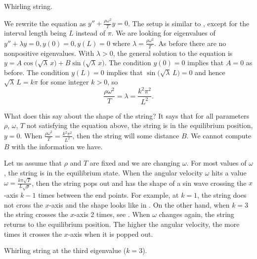 \begin{myfig}
\capstart
{}
\caption{Whirling string.\label{bvp:whirstringfig}}
\end{myfig}

We rewrite the equation as
$y'' + \frac{\rho \omega^2}{T} y = 0$.
The setup is similar to , except for the
interval length being $L$ instead of $\pi$.  We are looking for eigenvalues
of $y'' + \lambda y = 0, y(0) = 0, y(L) = 0$ where
$\lambda = \frac{\rho \omega^2}{T}$.  As before
there are no nonpositive eigenvalues.  With $\lambda > 0$,
the general solution to the equation is
$y = A \cos \bigl(  \sqrt{\lambda} \,x \bigr)
+ B \sin \bigl( \sqrt{\lambda} \,x \bigr)$.
The condition $y(0) = 0$ implies that $A = 0$ as
before.  The condition $y(L) = 0$ implies that
$\sin \bigl( \sqrt{\lambda} \, L\bigr) = 0$ and hence
$\sqrt{\lambda} \, L = k \pi$  for some integer $k > 0$, so
\begin{equation*}
\frac{\rho \omega^2}{T} = \lambda = \frac{k^2 \pi^2}{L^2} .
\end{equation*}

What does this say about the shape of the string?  It says that for
all parameters $\rho$, $\omega$, $T$ not satisfying the equation above, the
string is in the equilibrium position, $y=0$.  When 
$\frac{\rho \omega^2}{T} = \frac{k^2 \pi^2}{L^2}$, then the string will
 some distance $B$.  We cannot compute $B$
with the information we have.

Let us assume that $\rho$ and $T$ are fixed and we are changing $\omega$.
For most values of $\omega$, the string is in the equilibrium state.  When 
the angular velocity $\omega$ hits a value
$\omega = \frac{k \pi \sqrt{T}}{L\sqrt{\rho}}$, then the string 
pops out and has the shape of a sin wave crossing the
$x$-axis $k-1$ times between the end points.
For example, at $k=1$, the string does not cross the $x$-axis
and the shape looks like in .
On the other hand, when $k=3$ the string crosses the $x$-axis
2 times, see .
When $\omega$ changes again, the string returns to
the equilibrium position.  The higher the angular velocity,
the more times it crosses the $x$-axis when it is popped out.

\begin{myfig}
\capstart
{}
\caption{Whirling string at the third eigenvalue ($k=3$).\label{bvp:whirstring2fig}}
\end{myfig}

